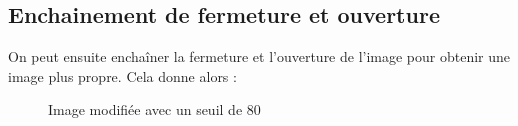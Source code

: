\documentclass[french,a4paper,10pt]{article}
\begin{document}
	\subsection{Enchainement de fermeture et ouverture}\label{subsec:3.3}

	On peut ensuite enchaîner la fermeture et l'ouverture de l'image pour obtenir une image plus propre.
	Cela donne alors :
	\begin{figure}[!htb]
		\begin{minipage}{0.30\textwidth}
			\centering
			\caption{Image modifiée avec un seuil de 80}\label{Fig:test-grey-08-6}
		\end{minipage}\hfill
		\begin{minipage}{0.30\textwidth}
			\centering

\end{minipage}
\end{figure}
\end{document}
